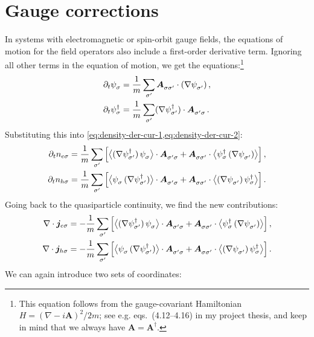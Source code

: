 \section{Gauge corrections}
In systems with electromagnetic or spin-orbit gauge fields, the equations of motion for the field operators also include a first-order derivative term.
Ignoring all other terms in the equation of motion, we get the equations:\footnote{This equation follows from the gauge-covariant Hamiltonian $H = (\nabla-i\bm{A})^2/2m$; see e.g. eqs.~(4.12--4.16) in my project thesis, and keep in mind that we always have $\bm{A} = \bm{A}^\dagger$.}
\begin{align}
  \p t \pc{\psi_\sigma} &= \frac{1}{m} \sum_{\sigma'} \pc{\bm{A}_{\sigma\sigma'}} \cdot (\nabla \pc{\psi_{\sigma'}}) \,, \\
  \p t \hc{\psi_\sigma} &= \frac{1}{m} \sum_{\sigma'} (\nabla \hc{\psi_{\sigma'}}) \cdot \pc{\bm{A}_{\sigma'\sigma}} \,.
\end{align}
Substituting this into \cref{eq:density-der-cur-1,eq:density-der-cur-2}:
\begin{align}
  \p t n_{e\sigma} &=
  \frac{1}{m} \sum_{\sigma'}
  \left[ 
    \avg[\big]{(\nabla \hc{\psi_{\sigma'}})\, \pc{\psi_{\sigma}}} \cdot \pc{\bm{A}_{\sigma'\sigma}} +
    \pc{\bm{A}_{\sigma\sigma'}} \cdot \avg[\big]{ \hc{\psi_{\sigma}}\, (\nabla \pc{\psi_{\sigma'}})}
  \right], \\
  \p t n_{h\sigma} &=
  \frac{1}{m} \sum_{\sigma'}
  \left[ 
    \avg[\big]{\pc{\psi_{\sigma}}\, (\nabla \hc{\psi_{\sigma'}})} \cdot \pc{\bm{A}_{\sigma'\sigma}} +
    \pc{\bm{A}_{\sigma\sigma'}} \cdot \avg[\big]{(\nabla \pc{\psi_{\sigma'}})\, \hc{\psi_{\sigma}}}
  \right]. 
\end{align}
Going back to the quasiparticle continuity, we find the new contributions:
\begin{align}
  \nabla \cdot \bm{j}_{e\sigma} &=
  -\frac{1}{m} \sum_{\sigma'}
  \left[ 
    \avg[\big]{(\nabla \hc{\psi_{\sigma'}})\, \pc{\psi_{\sigma}}} \cdot \pc{\bm{A}_{\sigma'\sigma}} +
    \pc{\bm{A}_{\sigma\sigma'}} \cdot \avg[\big]{ \hc{\psi_{\sigma}}\, (\nabla \pc{\psi_{\sigma'}})}
  \right], \\
  \nabla \cdot \bm{j}_{h\sigma} &=
  -\frac{1}{m} \sum_{\sigma'}
  \left[ 
    \avg[\big]{\pc{\psi_{\sigma}}\, (\nabla \hc{\psi_{\sigma'}})} \cdot \pc{\bm{A}_{\sigma'\sigma}} +
    \pc{\bm{A}_{\sigma\sigma'}} \cdot \avg[\big]{(\nabla \pc{\psi_{\sigma'}})\, \hc{\psi_{\sigma}}}
  \right]. 
\end{align}
We can again introduce two sets of coordinates:
